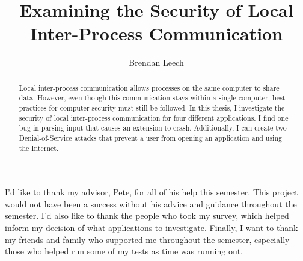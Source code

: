 \documentclass[midd]{thesis}
\title {Examining the Security of Local Inter-Process Communication}
\author {Brendan Leech}
\begin{document}
\maketitle
{}

\begin{abstract}
Local inter-process communication allows processes on the same computer to share data.  However, even though this communication stays within a single computer, best-practices for computer security must still be followed.  In this thesis, I investigate the security of local inter-process communication for four different applications.  I find one bug in parsing input that causes an extension to crash.  Additionally, I can create two Denial-of-Service attacks that prevent a user from opening an application and using the Internet.
\end{abstract}

\begin{acknowledgements}
I'd like to thank my advisor, Pete, for all of his help this semester.  This project would not have been a success without his advice and guidance throughout the semester.  I'd also like to thank the people who took my survey, which helped inform my decision of what applications to investigate.  Finally, I want to thank my friends and family who supported me throughout the semester, especially those who helped run some of my tests as time was running out.
\end{acknowledgements}

\contentspage
\tablelistpage   %
\figurelistpage

\normalspacing \setcounter{page}{1} 









\appendix






\end{document}
